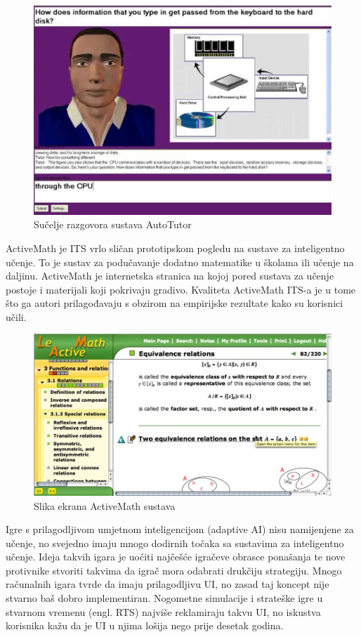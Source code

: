 \documentclass[times, utf8, zavrsni, numeric]{fer}
\begin{document}
\begin{figure}[htb]
	\centering
	\includegraphics[]{img/autotutor.jpg}
	\caption{Sučelje razgovora sustava AutoTutor\cite{autotutorpic}}
	\label{fig:autotutor}
\end{figure}

\par
ActiveMath je ITS vrlo sličan prototipskom pogledu na sustave za inteligentno učenje. To je sustav za podučavanje dodatno matematike u školama ili učenje na daljinu. ActiveMath je internetska stranica na kojoj pored sustava za učenje postoje i materijali koji pokrivaju gradivo. Kvaliteta ActiveMath ITS-a je u tome što ga autori prilagođavaju s obzirom na empirijske rezultate kako su korisnici učili.\cite{activemath}

\begin{figure}[htb]
	\centering
	\includegraphics[]{img/activemath.jpg}
	\caption{Slika ekrana ActiveMath sustava\cite{activemathpic}}
	\label{fig:activemath}
\end{figure}


\par
Igre s prilagodljivom umjetnom inteligencijom (adaptive AI) nisu namijenjene za učenje, no svejedno imaju mnogo dodirnih točaka sa sustavima za inteligentno učenje. Ideja takvih igara je uočiti najčešće igračeve obrasce ponašanja te nove protivnike stvoriti takvima da igrač mora odabrati drukčiju strategiju. Mnogo računalnih igara tvrde da imaju prilagodljivu UI, no zasad taj koncept nije stvarno baš dobro implementiran. Nogometne simulacije i strateške igre u stvarnom vremenu (engl. RTS) najviše reklamiraju takvu UI, no iskustva korisnika kažu da je UI u njima lošija nego prije desetak godina.\cite{adaptiveai}
\end{document}
